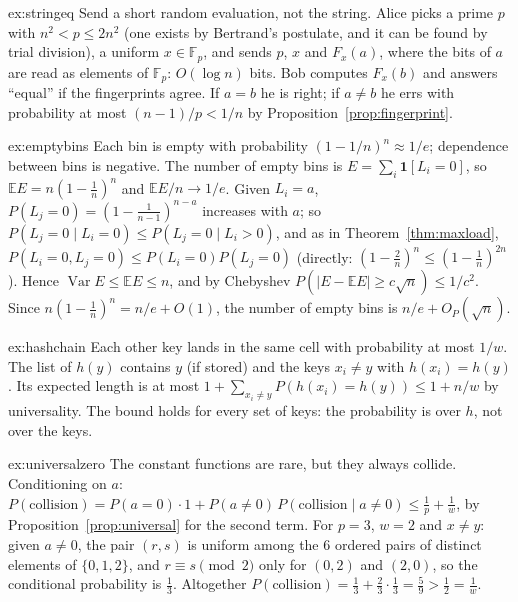 \begin{solution}{ex:stringeq}
\idea Send a short random evaluation, not the string.
\writeup Alice picks a prime $p$ with $n^2<p\le2n^2$ (one exists by Bertrand's postulate, and it can be found by trial division), a uniform $x\in\mathbb F_p$, and sends $p$, $x$ and $F_x(a)$, where the bits of $a$ are read as elements of $\mathbb F_p$: $O(\log n)$ bits. Bob computes $F_x(b)$ and answers ``equal'' if the fingerprints agree.
If $a=b$ he is right; if $a\ne b$ he errs with probability at most $(n-1)/p<1/n$ by Proposition~\ref{prop:fingerprint}.
\end{solution}

\begin{solution}{ex:emptybins}
\idea Each bin is empty with probability $(1-1/n)^n\approx1/e$; dependence between bins is negative.
\writeup The number of empty bins is $E=\sum_i\mathbf 1[L_i=0]$, so $\mathbb EE=n(1-\frac1n)^n$ and $\mathbb EE/n\to1/e$. Given $L_i=a$, $P(L_j=0)=(1-\frac1{n-1})^{n-a}$ increases with $a$; so $P(L_j=0\mid L_i=0)\le P(L_j=0\mid L_i>0)$, and as in Theorem~\ref{thm:maxload},
$P(L_i=0,L_j=0)\le P(L_i=0)P(L_j=0)$ (directly: $(1-\frac2n)^n\le(1-\frac1n)^{2n}$). Hence $\operatorname{Var}E\le\mathbb EE\le n$, and by Chebyshev $P(|E-\mathbb EE|\ge c\sqrt n)\le1/c^2$. Since $n(1-\frac1n)^n=n/e+O(1)$, the number of empty bins is $n/e+O_P(\sqrt n)$.
\end{solution}

\begin{solution}{ex:hashchain}
\idea Each other key lands in the same cell with probability at most $1/w$.
\writeup The list of $h(y)$ contains $y$ (if stored) and the keys $x_i\ne y$ with $h(x_i)=h(y)$. Its expected length is at most $1+\sum_{x_i\ne y}P(h(x_i)=h(y))\le1+n/w$ by universality. The bound holds for every set of keys: the probability is over $h$, not over the keys.
\end{solution}

\begin{solution}{ex:universalzero}
\idea The constant functions are rare, but they always collide.
\writeup Conditioning on $a$: $P(\text{collision})=P(a=0)\cdot1+P(a\ne0)\,P(\text{collision}\mid a\ne0)\le\frac1p+\frac1w$, by Proposition~\ref{prop:universal} for the second term. For $p=3$, $w=2$ and $x\ne y$: given $a\ne0$, the pair $(r,s)$ is uniform among the $6$ ordered pairs of distinct elements of $\{0,1,2\}$, and
$r\equiv s\pmod2$ only for $(0,2)$ and $(2,0)$, so the conditional probability is $\frac13$. Altogether $P(\text{collision})=\frac13+\frac23\cdot\frac13=\frac59>\frac12=\frac1w$.
\end{solution}

